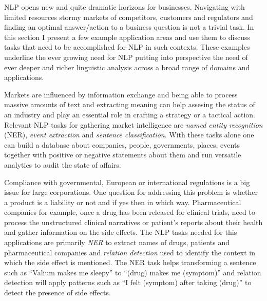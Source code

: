 NLP opens new and quite dramatic horizons for businesses. Navigating with limited resources stormy markets of competitors, customers and regulators and finding an optimal answer/action to a business question is not a trivial task. In this section I present a few example application areas and use them to discuss tasks that need to be accomplished for NLP in such contexts. These examples underline the ever growing need for NLP putting into perspective the need of ever deeper and richer linguistic analysis across a broad range of domains and applications.

Markets are influenced by information exchange and being able to process massive amounts of text and extracting meaning can help assesing the status of an industry and play an essential role in crafting a strategy or a tactical action. 
Relevant NLP tasks for gathering market intelligence are \textit{named entity recognition} (NER), \textit{event extraction} and \textit{sentence classification}. With these tasks alone one can build a database about companies, people, governments, places, events together with positive or negative statements about them and run versatile analytics to audit the state of affairs.

Compliance with governmental, European or international regulations is a big issue for large corporations. One question for addressing this problem is whether a product is a liability or not and if yes then in which way. Pharmaceutical companies for example, once a drug has been released for clinical trials, need to process the unstructured clinical narratives or patient's reports about their health and gather information on the side effects. The NLP tasks needed for this applications are primarily \textit{NER} to extract names of drugs, patients and pharmaceutical companies and \textit{relation detection} used to identify the context in which the side effect is mentioned. The NER task helps transforming a sentence such as ``Valium makes me sleepy'' to ``(drug) makes me (symptom)'' and relation detection will apply patterns such as ``I felt (symptom) after taking (drug)'' to detect the presence of side effects.


